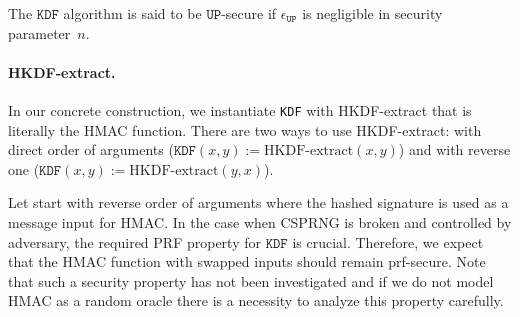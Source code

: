 \documentclass{article}
\begin{document}
The  $\texttt{KDF}$ algorithm is said to be $\texttt{UP}$-secure if $\epsilon_{\texttt{UP}}$ is negligible in security parameter~$n$.

\paragraph{HKDF-extract.}

In our concrete construction, we instantiate \texttt{KDF} with HKDF-extract that is literally the HMAC function.  There are two ways to use  HKDF-extract: with direct order of arguments ($\texttt{KDF}(x,y) := \text{HKDF-extract}(x,y)$) and with reverse one ($\texttt{KDF}(x,y) := \text{HKDF-extract}(y,x)$). 

Let start with reverse order of arguments where the hashed signature is used as a message input for HMAC. In the case when CSPRNG is broken and controlled by adversary, the required PRF property for $\texttt{KDF}$ is crucial. Therefore, we expect that the HMAC function with swapped inputs should remain prf-secure. Note that such a security property has not been investigated and if we do not model HMAC as a random oracle there is a necessity to analyze this property carefully.
\end{document}
